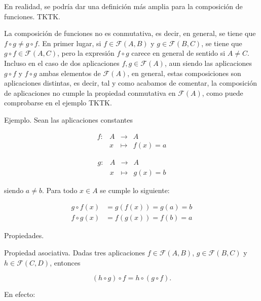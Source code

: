 En realidad, se podría dar una definición más amplia para la composición de
funciones. TKTK.

La composición de funciones no es conmutativa, es decir, en general, se
tiene que $f \circ g \neq g \circ f$. En primer lugar, si $f \in
\mathcal{F}(A, B)$ y $g \in \mathcal{F}(B, C)$, se tiene que $g \circ f \in
\mathcal{F}(A, C)$, pero la expresión $f \circ g$ carece en general de
sentido si $A \neq C$. Incluso en el caso de dos aplicaciones $f, g \in
\mathcal{F}(A)$, aun siendo las aplicaciones $g \circ f$ y $f \circ g$ ambas
elementos de $\mathcal{F}(A)$, en general, estas composiciones son
aplicaciones distintas, es decir, tal y como acabamos de comentar, la
composición de aplicaciones no cumple la propiedad conmutativa en
$\mathcal{F}(A)$, como puede comprobarse en el ejemplo TKTK.

Ejemplo. Sean las aplicaciones constantes

\begin{center}
\begin{minipage}[t]{.45\textwidth}
  \centering
  $$
    \begin{array}{llll}
      f:  & A & \longrightarrow & A \\
          & x & \longmapsto     & f(x) = a
    \end{array}
  $$
\end{minipage}
\begin{minipage}[t]{.45\textwidth}
  \centering
  $$
    \begin{array}{llll}
      g:  & A & \longrightarrow & A \\
          & x & \longmapsto     & g(x) = b
    \end{array}
  $$
\end{minipage}
\end{center}

\noindent siendo $a \neq b$. Para todo $x \in A$ se cumple lo siguiente:

\begin{align*}
  g \circ f(x) &= g(f(x)) = g(a) = b \\
  f \circ g(x) &= f(g(x)) = f(b) = a
\end{align*}


Propiedades.

Propiedad asociativa. Dadas tres aplicaciones $f \in \mathcal{F}(A, B)$, $g
\in \mathcal{F}(B, C)$ y $h \in \mathcal{F}(C, D)$, entonces

$$ (h \circ g) \circ f = h \circ (g \circ f). $$

\noindent En efecto:

